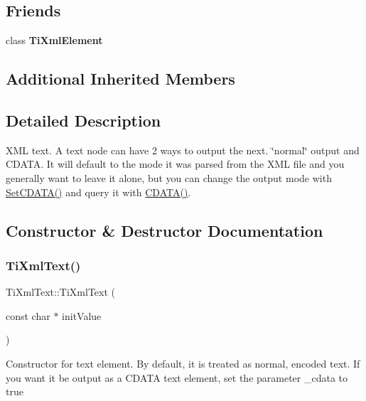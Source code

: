 \subsection*{Friends}
\begin{DoxyCompactItemize}
\item 
\hypertarget{class_ti_xml_text_ab6592e32cb9132be517cc12a70564c4b}{}\label{class_ti_xml_text_ab6592e32cb9132be517cc12a70564c4b} 
class {\bfseries Ti\+Xml\+Element}
\end{DoxyCompactItemize}
\subsection*{Additional Inherited Members}


\subsection{Detailed Description}
X\+ML text. A text node can have 2 ways to output the next. \char`\"{}normal\char`\"{} output and C\+D\+A\+TA. It will default to the mode it was parsed from the X\+ML file and you generally want to leave it alone, but you can change the output mode with \hyperlink{class_ti_xml_text_acb17ff7c5d09b2c839393445a3de5ea9}{Set\+C\+D\+A\+T\+A()} and query it with \hyperlink{class_ti_xml_text_aac1f4764d220ed6bf809b16dfcb6b45a}{C\+D\+A\+T\+A()}. 

\subsection{Constructor \& Destructor Documentation}
\hypertarget{class_ti_xml_text_af659e77c6b87d684827f35a8f4895960}{}\label{class_ti_xml_text_af659e77c6b87d684827f35a8f4895960} 
\subsubsection{\texorpdfstring{Ti\+Xml\+Text()}{TiXmlText()}}
{\footnotesize\ttfamily Ti\+Xml\+Text\+::\+Ti\+Xml\+Text (\begin{DoxyParamCaption}\item[{const char $\ast$}]{init\+Value }\end{DoxyParamCaption})\hspace{0.3cm}{\ttfamily [inline]}}

Constructor for text element. By default, it is treated as normal, encoded text. If you want it be output as a C\+D\+A\+TA text element, set the parameter \+\_\+cdata to \textquotesingle{}true\textquotesingle{} 

